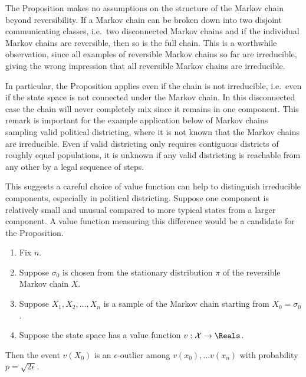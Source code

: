 \documentclass[12pt]{article}
\begin{document}
\begin{remark}
    The Proposition makes no assumptions on the structure of the Markov
    chain beyond reversibility.  If a Markov chain can be broken down
    into two disjoint communicating classes, i.e.\ two disconnected
    Markov chains and if the individual Markov chains are reversible,
    then so is the full chain.  This is a worthwhile observation, since
    all examples of reversible Markov chains so far are irreducible,
    giving the wrong impression that all reversible Markov chains are
    irreducible.

    In particular, the Proposition applies even if the chain is not
    irreducible, i.e.\ even if the state space is not connected under
    the Markov chain.  In this disconnected case the chain will never
    completely mix since it remains in one component.  This remark is
    important for the example application below of Markov chains
    sampling valid political districting, where it is not known that the
    Markov chains are irreducible.  Even if valid districting only
    requires contiguous districts of roughly equal populations, it is
    unknown if any valid districting is reachable from any other by a
    legal sequence of steps.

    This suggests a careful choice of value function can help to
    distinguish irreducible components, especially in political
    districting.  Suppose one component is relatively small and unusual
    compared to more typical states from a larger component. A value
    function measuring this difference would be a candidate for the
    Proposition.
\end{remark}

\begin{corollary}
    \label{thm:serialsignificance:sqrtepstest}
    \begin{enumerate}
        \item
            Fix \( n \).
        \item
            Suppose \( \sigma_0 \) is chosen from the stationary
            distribution \( \pi \) of the reversible Markov chain \( X \).
        \item
            Suppose \( X_1, X_2, \dots, X_n \) is a sample of the Markov
            chain starting from \( X_0 = \sigma_0 \).
        \item
            Suppose the state space has a value function \( v :
            \mathcal {X} \to \Reals \).
    \end{enumerate}
    Then the event \( v(X_0) \) is an \( \epsilon \)-outlier among \( v(x_0),
    \dots v(x_n ) \) with probability \( p = \sqrt{2\epsilon} \).
\end{corollary}
\end{document}
